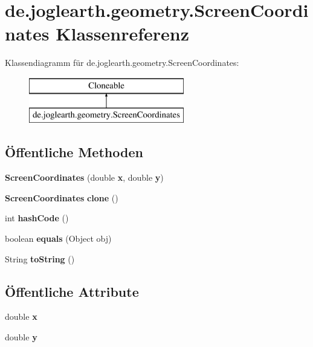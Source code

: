 \section{de.\-joglearth.\-geometry.\-Screen\-Coordinates Klassenreferenz}
\label{classde_1_1joglearth_1_1geometry_1_1_screen_coordinates}
Klassendiagramm für de.\-joglearth.\-geometry.\-Screen\-Coordinates\-:\begin{figure}[H]
\begin{center}
\leavevmode
\includegraphics[height=2.000000cm]{classde_1_1joglearth_1_1geometry_1_1_screen_coordinates}
\end{center}
\end{figure}
\subsection*{Öffentliche Methoden}
\begin{DoxyCompactItemize}
\item 
{\bf Screen\-Coordinates} (double {\bf x}, double {\bf y})
\item 
{\bf Screen\-Coordinates} {\bfseries clone} ()\label{classde_1_1joglearth_1_1geometry_1_1_screen_coordinates_a331deb737a91c46e453ea2ea1639ca0e}

\item 
int {\bfseries hash\-Code} ()\label{classde_1_1joglearth_1_1geometry_1_1_screen_coordinates_a7e35e8e493e19c3e0e0af19408423fab}

\item 
boolean {\bfseries equals} (Object obj)\label{classde_1_1joglearth_1_1geometry_1_1_screen_coordinates_a2471c92c5ffd1a500a647e86b316510c}

\item 
String {\bfseries to\-String} ()\label{classde_1_1joglearth_1_1geometry_1_1_screen_coordinates_aebaa9728690fe826983dc18e09f4fa07}

\end{DoxyCompactItemize}
\subsection*{Öffentliche Attribute}
\begin{DoxyCompactItemize}
\item 
double {\bf x}
\item 
double {\bf y}
\end{DoxyCompactItemize}



